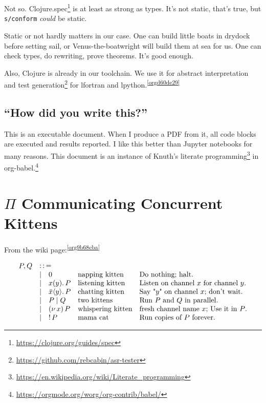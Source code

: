 \documentclass[10pt,oneside,x11names]{article}
\newcommand{\Coloneqq}{\mathrel{\vcenter{\hbox{$:\,:\,=$}}{}}}
\newcommand\napping    [0]{0}
\newcommand\chatting   [3]{\bar{#1}\langle{#2}\rangle{}.\,#3}
\newcommand\listening  [3]{#1(#2).\,#3}
\newcommand\two        [2]{#1\mathrel{\vert}{#2}}
\newcommand\whispering [2]{(\nu\,#1)\,{#2}}
\newcommand\mama       [1]{!\,{#1}}
\theoremstyle{definition}
\theoremstyle{warning}
\begin{document}
Not so. Clojure.spec\footnote{\url{https://clojure.org/guides/spec}} is at
least as strong as types. It's not static, that's true, but
\texttt{s/conform} \emph{could} be static.

Static or not hardly matters in our case. One can build little
boats in drydock before setting sail, or Venus-the-boatwright will
build them at sea for us. One can check types, do rewriting,
prove theorems. It's good enough.

Also, Clojure is already in our toolchain. We use it for abstract
interpretation and test generation\footnote{\url{https://github.com/rebcabin/asr-tester}}
for lfortran and lpython.\textsuperscript{\ref{orgd60de29}}

\subsection{``How did you write this?''}
\label{sec:orge73f237}

This is an executable document. When I produce a PDF from it, all
code blocks are executed and results reported. I like this better
than Jupyter notebooks for many reasons. This document
is an instance of Knuth's literate programming\footnote{\url{https://en.wikipedia.org/wiki/Literate\_programming}}
in org-babel.\footnote{\url{https://orgmode.org/worg/org-contrib/babel/}}

\newpage
\section{\(\Pi\) Communicating Concurrent Kittens}
\label{sec:orgfd43334}

From the wiki page:\textsuperscript{\ref{org9b68cba}}

\begin{equation}
\begin{array}{clll}
  P, Q & \Coloneqq \\
       & | \quad \napping            & \textrm{napping kitten}    & \textrm{Do nothing; halt.}                                    \\
       & | \quad \listening{x}{y}{P} & \textrm{listening kitten}  & \textrm{Listen on channel }x\textrm{ for channel }y\textrm{.} \\
       & | \quad \chatting{x}{y}{P}  & \textrm{chatting kitten}   & \textrm{Say "}y\textrm{" on channel }x\textrm{; don't wait.}  \\
       & | \quad \two{P}{Q}          & \textrm{two kittens}       & \textrm{Run }P\textrm{ and }Q\textrm{ in parallel.}           \\
       & | \quad \whispering{x}{P}   & \textrm{whispering kitten} & \textrm{fresh channel name }x\textrm{; Use it in }P\textrm{.} \\
       & | \quad \mama{P}            & \textrm{mama cat}          & \textrm{Run copies of }P\textrm{ forever.} \\
\end{array}
\end{equation}
\end{document}
